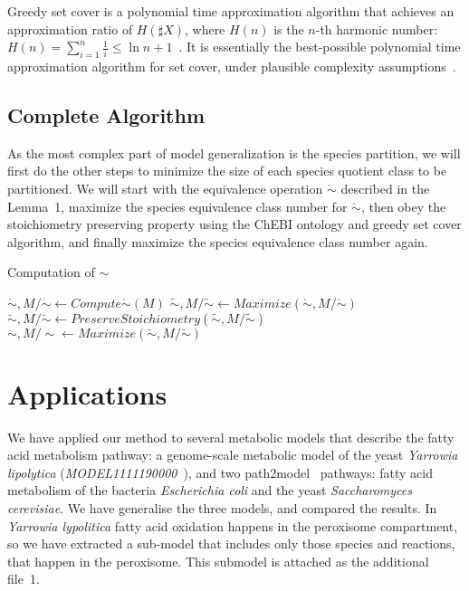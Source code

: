 \documentclass[10pt]{bmc_article}
\newenvironment{bmcformat}{\baselineskip20pt\sloppy\setboolean{publ}{false}}{\baselineskip20pt\sloppy}
\begin{document}
\begin{bmcformat}
Greedy set cover is a polynomial time approximation algorithm that achieves an approximation ratio of $H(\sharp X)$, where $H(n)$ is the $n$-th harmonic number: $H(n) = \sum^n_{i = 1}\frac{1}{i} \leq \ln{n} + 1$~\cite{Chvatal1979}. It is essentially the best-possible polynomial time approximation algorithm for set cover, under plausible complexity assumptions~\cite{Lund1994}. 

\subsection*{Complete Algorithm}
As the most complex part of model generalization is the species partition, we will first do the other steps to minimize the size of each species quotient class to be partitioned. We will start with the equivalence operation $\mathring{\sim}$ described in the Lemma~1, maximize the species equivalence class number for $\mathring{\sim}$, then obey the stoichiometry preserving property using the ChEBI ontology and greedy set cover algorithm, and finally maximize the species equivalence class number again.\\

\begin{algorithm}[H]
\SetAlgoVlined
{}
\caption{Computation of ${\sim}$}
\BlankLine
\BlankLine
$\mathring{\sim}, M/\mathring{\sim} \leftarrow Compute\mathring{\sim}(M)$ \;
$\tilde{\sim}, M/\tilde{\sim} \leftarrow Maximize(\mathring{\sim}, M/{\mathring{\sim}})$ \;
$\breve{\sim}, M/\breve{\sim} \leftarrow PreserveStoichiometry(\tilde{\sim}, M/\tilde{\sim})$ \;
$\sim, M/\sim \leftarrow Maximize(\breve{\sim}, M/\breve{\sim})$ \;
\BlankLine
{}
\end{algorithm} 

\section*{Applications}
We have applied our method to several metabolic models that describe the fatty acid metabolism pathway:  a genome-scale metabolic model of the yeast \textit{Yarrowia lipolytica} (\emph{MODEL1111190000}~\cite{Loira12}), and two path2model~\cite{http://www.ebi.ac.uk/biomodels-main/path2models} pathways: fatty acid metabolism of the bacteria \textit{Escherichia coli} and the yeast \textit{Saccharomyces cerevisiae}. We have generalise the three models, and compared the results. 
In \textit{Yarrowia lypolitica} fatty acid oxidation happens in the peroxisome compartment, so we have extracted a sub-model that includes only those species and reactions, that happen in the peroxisome. This submodel is attached as the additional file~1. 




\end{bmcformat}
\end{document}
